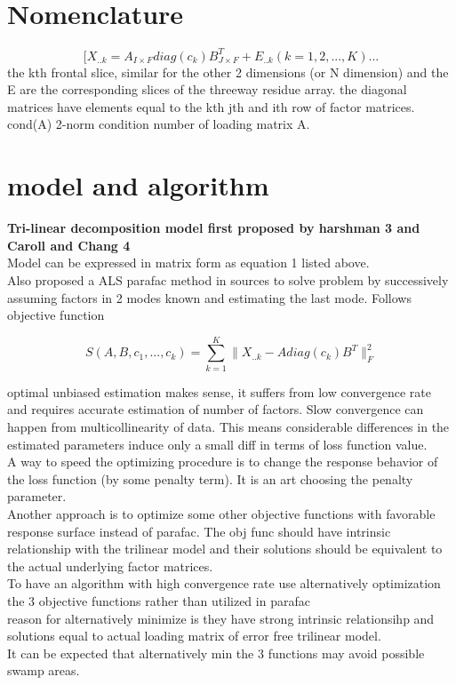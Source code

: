 \documentclass[10pt, draft]{article}
\begin{document}
\section{Nomenclature}
\[[X_{..k} = A_{I \times F} diag(c_k) B^T_{J \times F} + E_{..k} (k = 1,2, ..., K) ...\]
the kth frontal slice, similar for the other 2 dimensions (or N dimension) and the E are the corresponding slices of the threeway residue array.  the diagonal matrices have elements equal to the kth jth and ith row of factor matrices.  cond(A) 2-norm condition number of loading matrix A.

\section{model and algorithm}
\textbf{Tri-linear decomposition model first proposed by harshman 3 and Caroll and Chang 4}\\
Model can be expressed in matrix form as equation 1 listed above.\\
Also proposed a ALS parafac method in sources to solve problem by successively assuming factors in 2 modes known and estimating the last mode.  Follows objective function

\[S(A,B,c_1,...,c_k) = \sum_{k=1}^K \| X_{..k} - Adiag(c_k)B^T \|_F^2\]

optimal unbiased estimation makes sense, it suffers from low convergence rate and requires accurate estimation of number of factors.  Slow convergence can happen from multicollinearity of data.  This means considerable differences in the estimated parameters induce only a small diff in terms of loss function value.  \\

A way to speed the optimizing procedure is to change the response behavior of the loss function (by some penalty term).  It is an art choosing the penalty parameter.  \\
Another approach is to optimize some other objective functions with favorable response surface instead of parafac.  The obj func should have intrinsic relationship with the trilinear model and their solutions should be equivalent to the actual underlying factor matrices.  \\
To have an algorithm with high convergence rate use alternatively optimization the 3 objective functions rather than utilized in parafac\\
reason for alternatively minimize is they have strong intrinsic relationsihp and solutions equal to actual loading matrix of error free trilinear model.\\It can be expected that alternatively min the 3 functions may avoid possible swamp areas.  \\
\end{document}
